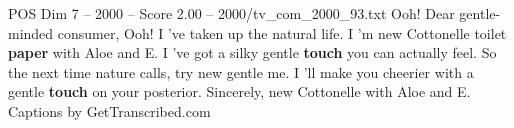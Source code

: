 \begin{textsample}{POS Dim 7 – 2000 – Score 2.00 – 2000/tv\_com\_2000\_93.txt}  \label{ex:f7_pos_051}
Ooh!
Dear gentle-minded consumer, Ooh!
I 've taken up the natural life.
I 'm new Cottonelle toilet \textbf{paper} with Aloe and E.
I 've got a silky gentle \textbf{touch} you can actually feel.
So the next time nature calls, try new gentle me.
I 'll make you cheerier with a gentle \textbf{touch} on your posterior.
Sincerely, new Cottonelle with Aloe and E.
Captions by GetTranscribed.com

\end{textsample}
